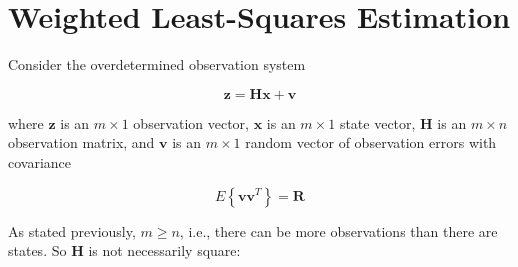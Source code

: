\documentclass[12pt]{article}
\begin{document}
\clearpage



\section{Weighted Least-Squares Estimation}

Consider the overdetermined observation system

\begin{equation*}
    \mathbf{z} = \mathbf{H} \mathbf{x} + \mathbf{v}
\end{equation*}

where $\mathbf{z}$ is an $m \times 1$ observation vector,
$\mathbf{x}$ is an $m \times 1$ state vector,
$\mathbf{H}$ is an $m \times n$ observation matrix,
and $\mathbf{v}$ is an $m \times 1$ random vector of observation errors with covariance

\begin{equation*}
    E \left\{ \mathbf{v} \mathbf{v}^T \right\} = \mathbf{R}
\end{equation*}

As stated previously, $m \ge n$, i.e., there can be more observations than there are states.
So $\mathbf{H}$ is not necessarily square:
\end{document}
